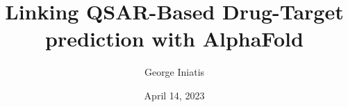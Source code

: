 \documentclass{mpaper}
\begin{document}
\title{Linking QSAR-Based Drug-Target prediction with AlphaFold}
\author{George Iniatis }
\date{April 14, 2023}

\maketitle










\pagebreak
{\footnotesize
}

\end{document}
